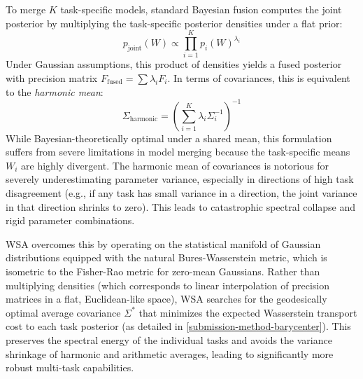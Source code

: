 \documentclass{article}
\theoremstyle{plain}
\theoremstyle{definition}
\theoremstyle{remark}
\begin{document}
To merge $K$ task-specific models, standard Bayesian fusion computes the joint posterior by multiplying the task-specific posterior densities under a flat prior:
\begin{equation}
  p_{\text{joint}}(W) \propto \prod_{i=1}^K p_i(W)^{\lambda_i}
\end{equation}
Under Gaussian assumptions, this product of densities yields a fused posterior with precision matrix $F_{\text{fused}} = \sum \lambda_i F_i$. In terms of covariances, this is equivalent to the \emph{harmonic mean}:
\begin{equation}
  \Sigma_{\text{harmonic}} = \left( \sum_{i=1}^K \lambda_i \Sigma_i^{-1} \right)^{-1}
\end{equation}
While Bayesian-theoretically optimal under a shared mean, this formulation suffers from severe limitations in model merging because the task-specific means $W_i$ are highly divergent. The harmonic mean of covariances is notorious for severely underestimating parameter variance, especially in directions of high task disagreement (e.g., if any task has small variance in a direction, the joint variance in that direction shrinks to zero). This leads to catastrophic spectral collapse and rigid parameter combinations.

WSA overcomes this by operating on the statistical manifold of Gaussian distributions equipped with the natural Bures-Wasserstein metric, which is isometric to the Fisher-Rao metric for zero-mean Gaussians. Rather than multiplying densities (which corresponds to linear interpolation of precision matrices in a flat, Euclidean-like space), WSA searches for the geodesically optimal average covariance $\Sigma^*$ that minimizes the expected Wasserstein transport cost to each task posterior (as detailed in \cref{submission-method-barycenter}). This preserves the spectral energy of the individual tasks and avoids the variance shrinkage of harmonic and arithmetic averages, leading to significantly more robust multi-task capabilities.
\end{document}
